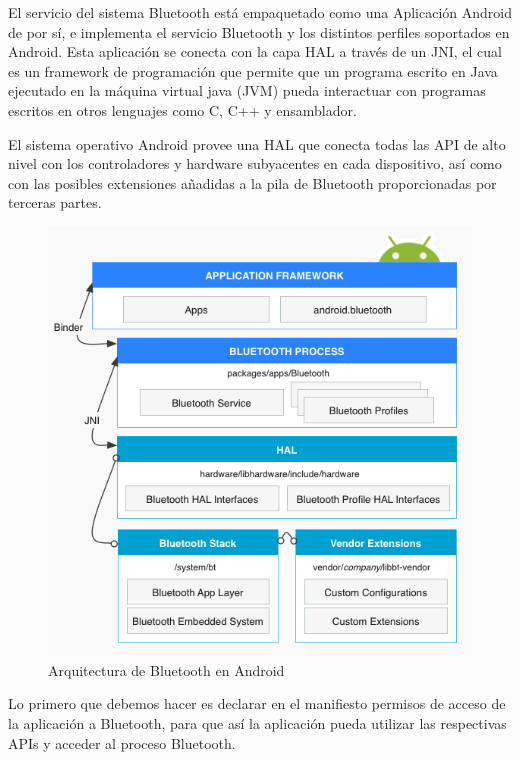 	El servicio del sistema Bluetooth está empaquetado como una Aplicación Android de por sí, e implementa el servicio Bluetooth y los distintos perfiles soportados en Android. Esta aplicación se conecta con la capa \ac{HAL} a través de un \ac{JNI}, el cual es un framework de programación que permite que un programa escrito en Java ejecutado en la máquina virtual java (JVM) pueda interactuar con programas escritos en otros lenguajes como C, C++ y ensamblador.

    El sistema operativo Android provee una \ac{HAL} que conecta todas las \ac{API} de alto nivel con los controladores y hardware subyacentes en cada dispositivo, así como con las posibles extensiones añadidas a la pila de Bluetooth proporcionadas por terceras partes.
    
    \begin{figure}[!htpb] \centering
    	\includegraphics[width=15cm]{graphs/bluetoothandroid.png} \caption{Arquitectura de Bluetooth en Android  \cite{bluetoothhal}}\label{fig:diagrama:bluetoothhal}
    \end{figure}
    
    Lo primero que debemos hacer es declarar en el manifiesto permisos de acceso de la aplicación a Bluetooth, para que así la aplicación pueda utilizar las respectivas APIs y acceder al proceso Bluetooth.
    
